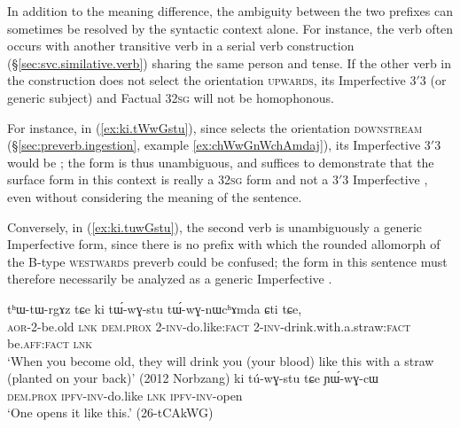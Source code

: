 In addition to the meaning difference, the ambiguity between the two prefixes can sometimes be resolved by the syntactic context alone. For instance, the verb  often occurs with another transitive verb in a serial verb construction (§\ref{sec:svc.similative.verb}) sharing the same person and tense. If the other verb in the construction does not select the orientation \textsc{upwards}, its Imperfective 3$'$\fl{}3 (or generic subject) and Factual 3\fl{}2\textsc{sg} will not be homophonous. 

For instance, in (\ref{ex:ki.tWwGstu}), since  selects the orientation \textsc{downstream} (§\ref{sec:preverb.ingestion}, example \ref{ex:chWwGnWchAmdaj}), its Imperfective 3$'$\fl{}3 would be ; the form  is thus unambiguous, and suffices to demonstrate that the surface form  in this context is really a 3\fl{}2\textsc{sg} form  and not a 3$'$\fl{}3 Imperfective , even without considering the meaning of the sentence.

Conversely, in (\ref{ex:ki.tuwGstu}), the second verb  is unambiguously a generic Imperfective form, since there is no prefix with which the rounded allomorph of the B-type \textsc{westwards} preverb  could be confused; the form  in this sentence must therefore necessarily be analyzed as a generic Imperfective .

\begin{exe}
	\ex   \label{ex:tuwGstu.ambiguity}
	\begin{xlist}
		\ex   \label{ex:ki.tWwGstu}
		\gll tʰɯ-tɯ-rgɤz tɕe ki tɯ́-wɣ-stu tɯ́-wɣ-nɯcʰɤmda ɕti tɕe, \\
		\textsc{aor}-2-be.old \textsc{lnk} \textsc{dem}.\textsc{prox} 2-\textsc{inv}-do.like:\textsc{fact} 2-\textsc{inv}-drink.with.a.straw:\textsc{fact} be.\textsc{aff}:\textsc{fact} \textsc{lnk} \\
		\glt `When you become old, they will drink you (your blood) like this with a straw (planted on your back)' (2012 Norbzang) 
		\ex   \label{ex:ki.tuwGstu}
		\gll ki tú-wɣ-stu tɕe ɲɯ́-wɣ-cɯ  \\
		\textsc{dem}.\textsc{prox} \textsc{ipfv}-\textsc{inv}-do.like \textsc{lnk} \textsc{ipfv}-\textsc{inv}-open \\
		\glt `One opens it like this.' (26-tCAkWG)
	\end{xlist}
\end{exe}

